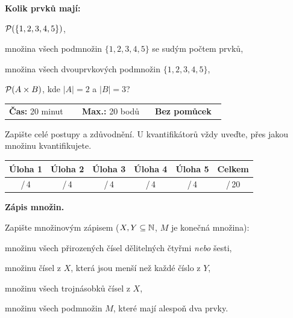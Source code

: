 \documentclass[11pt,a4paper]{article}
\begin{document}
\Needspace*{7.8cm}
\textbf{Kolik prvků mají:}
\begin{pol}
  \item $\mathcal P(\{1,2,3,4,5\})$,
  \item množina všech podmnožin $\{1,2,3,4,5\}$ se sudým počtem prvků,
  \item množina všech dvouprvkových podmnožin $\{1,2,3,4,5\}$,
  \item $\mathcal P(A\times B)$, kde $|A|=2$ a $|B|=3$?
\end{pol}
\misto{4.4cm}

\newpage
{}

\begin{tcolorbox}[enhanced,colback=white,colframe=accent,boxrule=0.8pt,arc=4pt,left=12pt,right=12pt,top=7pt,bottom=7pt,before skip=2pt,after skip=4pt]
\sffamily\small
\begin{tabular}{@{}p{0.31\linewidth}p{0.31\linewidth}p{0.3\linewidth}@{}}
\textbf{Čas:} 20 minut & \textbf{Max.:} 20 bodů & \textbf{Bez pomůcek} \\
\end{tabular}
\par\vspace{4pt}
{\color{muted}Zapište celé postupy a zdůvodnění. U kvantifikátorů vždy uveďte, přes jakou množinu kvantifikujete.}
\end{tcolorbox}
\begin{center}
\sffamily\small
\renewcommand{\arraystretch}{1.6}
\setlength{\tabcolsep}{10pt}
\begin{tabular}{|c|c|c|c|c|c|}
\hline
\color{muted}Úloha 1 & \color{muted}Úloha 2 & \color{muted}Úloha 3 & \color{muted}Úloha 4 & \color{muted}Úloha 5 & \textbf{Celkem}\\
\hline
\hspace{1cm}/\,4 & \hspace{1cm}/\,4 & \hspace{1cm}/\,4 & \hspace{1cm}/\,4 & \hspace{1cm}/\,4 & \hspace{1.2cm}/\,20\\
\hline
\end{tabular}
\end{center}


\Needspace*{7.6cm}
\textbf{Zápis množin.}\par
Zapište množinovým zápisem ($X,Y\subseteq\mathbb N$, $M$ je konečná množina):
\begin{pol}
  \item množinu všech přirozených čísel dělitelných čtyřmi \emph{nebo} šesti,
  \item množinu čísel z $X$, která jsou menší než každé číslo z $Y$,
  \item množinu všech trojnásobků čísel z $X$,
  \item množinu všech podmnožin $M$, které mají alespoň dva prvky.
\end{pol}
\misto{4.2cm}
\end{document}
